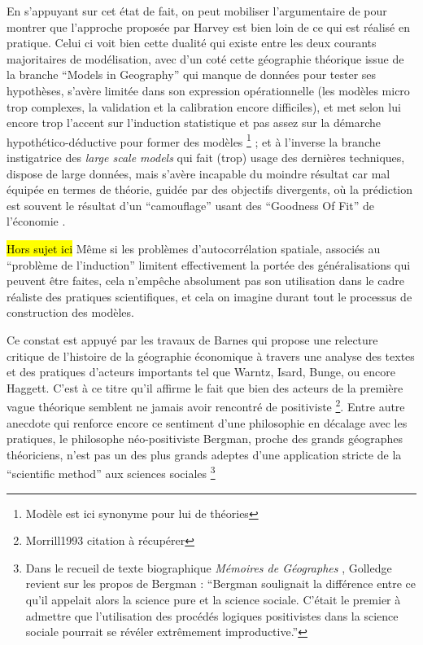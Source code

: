 En s'appuyant sur cet état de fait, on peut mobiliser l'argumentaire de \textcite{Wilson1972} pour montrer que l'approche proposée par Harvey est bien loin de ce qui est réalisé en pratique. Celui ci voit bien cette dualité qui existe entre les deux courants majoritaires de modélisation, avec d'un coté cette géographie théorique issue de la branche \foreignquote{english}{Models in Geography} qui manque de données pour tester ses hypothèses, s'avère limitée dans son expression opérationnelle (les modèles micro trop complexes, la validation et la calibration encore difficiles), et met selon lui encore trop l'accent sur l'induction statistique et pas assez sur la démarche hypothético-déductive pour former des modèles \footnote{Modèle est ici synonyme pour lui de théories} ; et à l'inverse la branche instigatrice des \textit{large scale models} qui fait (trop) usage des dernières techniques, dispose de large données, mais s'avère incapable du moindre résultat car mal équipée en termes de théorie, guidée par des objectifs divergents, où la prédiction est souvent le résultat d'un \enquote{camouflage} usant des \foreignquote{english}{Goodness Of Fit} de l'économie \autocite[10]{Batty1994}.

\hl{Hors sujet ici }
Même si les problèmes d'autocorrélation spatiale, associés au \enquote{problème de l'induction} limitent effectivement la portée des généralisations qui peuvent être faites, cela n’empêche absolument pas son utilisation dans le cadre réaliste des pratiques scientifiques, et cela on imagine durant tout le processus de construction des modèles.


Ce constat est appuyé par les travaux de Barnes qui propose une relecture critique de l'histoire de la géographie économique \autocite[122]{Barnes1996} à travers une analyse des textes et des pratiques d'acteurs importants tel que Warntz, Isard, Bunge, ou encore Haggett. C'est à ce titre qu'il affirme \autocite{Barnes2001a} le fait que bien des acteurs de la première vague théorique semblent ne jamais avoir rencontré de positiviste \footnote{Morrill1993 citation à récupérer}. Entre autre anecdote qui renforce encore ce sentiment d'une philosophie en décalage avec les pratiques, le philosophe néo-positiviste Bergman, proche des grands géographes théoriciens, n'est pas un des plus grands adeptes d'une application stricte de la \foreignquote{english}{scientific method} aux sciences sociales \footnote{Dans le recueil de texte biographique \textit{Mémoires de Géographes} \textcite[96]{Bailly2000}, Golledge revient sur les propos de Bergman : \enquote{Bergman soulignait la différence entre ce qu'il appelait alors la science pure et la science sociale. C'était le premier à admettre que l'utilisation des procédés logiques positivistes dans la science sociale pourrait se révéler extrêmement improductive.} }

